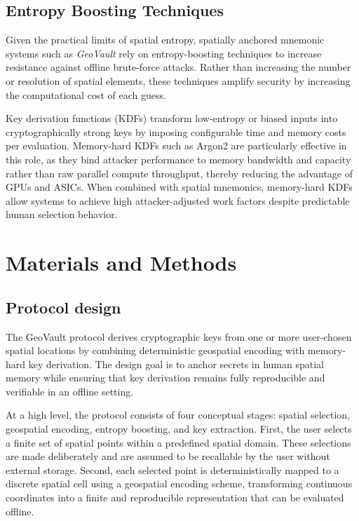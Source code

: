 \documentclass[journal,article,submit,pdftex,moreauthors]{Definitions/mdpi}
\begin{document}
\subsection{Entropy Boosting Techniques}

Given the practical limits of spatial entropy, spatially anchored mnemonic systems such as \textit{GeoVault} rely on entropy-boosting techniques to increase resistance against offline brute-force attacks. Rather than increasing the number or resolution of spatial elements, these techniques amplify security by increasing the computational cost of each guess.

Key derivation functions (KDFs) transform low-entropy or biased inputs into cryptographically strong keys by imposing configurable time and memory costs per evaluation. Memory-hard KDFs such as Argon2 are particularly effective in this role, as they bind attacker performance to memory bandwidth and capacity rather than raw parallel compute throughput, thereby reducing the advantage of GPUs and ASICs. When combined with spatial mnemonics, memory-hard KDFs allow systems to achieve high attacker-adjusted work factors despite predictable human selection behavior.


\section{Materials and Methods}

\subsection{Protocol design}

The GeoVault protocol derives cryptographic keys from one or more user-chosen spatial locations by combining deterministic geospatial encoding with memory-hard key derivation. The design goal is to anchor secrets in human spatial memory while ensuring that key derivation remains fully reproducible and verifiable in an offline setting.

At a high level, the protocol consists of four conceptual stages: spatial selection, geospatial encoding, entropy boosting, and key extraction. First, the user selects a finite set of spatial points within a predefined spatial domain. These selections are made deliberately and are assumed to be recallable by the user without external storage. Second, each selected point is deterministically mapped to a discrete spatial cell using a geospatial encoding scheme, transforming continuous coordinates into a finite and reproducible representation that can be evaluated offline.
\end{document}
